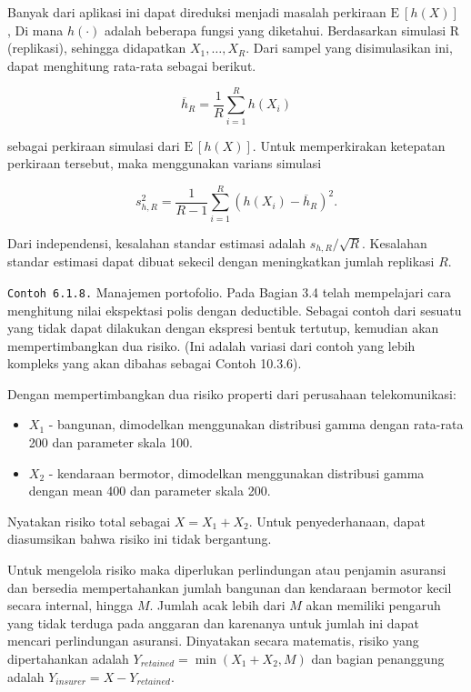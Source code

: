 \documentclass[
]{book}
\begin{document}
Banyak dari aplikasi ini dapat direduksi menjadi masalah perkiraan \(\mathrm{E~}[h(X)]\) , Di mana \(h(\cdot)\) adalah beberapa fungsi yang diketahui. Berdasarkan simulasi R (replikasi), sehingga didapatkan \(X_1,\ldots,X_R\). Dari sampel yang disimulasikan ini, dapat menghitung rata-rata sebagai berikut.

\[\overline{h}_R=\frac{1}{R}\sum_{i=1}^{R} h(X_i)\]

sebagai perkiraan simulasi dari \(\mathrm{E~}[h(X)]\). Untuk memperkirakan ketepatan perkiraan tersebut, maka menggunakan varians simulasi

\[s_{h,R}^2 = \frac{1}{R-1} \sum_{i=1}^{R}\left( h(X_i) -\overline{h}_R
\right) ^2.\]

Dari independensi, kesalahan standar estimasi adalah \(s_{h,R}/\sqrt{R}\). Kesalahan standar estimasi dapat dibuat sekecil dengan meningkatkan jumlah replikasi \(R\).

\texttt{Contoh\ 6.1.8.} Manajemen portofolio. Pada Bagian 3.4 telah mempelajari cara menghitung nilai ekspektasi polis dengan deductible. Sebagai contoh dari sesuatu yang tidak dapat dilakukan dengan ekspresi bentuk tertutup, kemudian akan mempertimbangkan dua risiko. (Ini adalah variasi dari contoh yang lebih kompleks yang akan dibahas sebagai Contoh 10.3.6).

Dengan mempertimbangkan dua risiko properti dari perusahaan telekomunikasi:

\begin{itemize}
\item
  \(X_1\) - bangunan, dimodelkan menggunakan distribusi gamma dengan rata-rata 200 dan parameter skala 100.
\item
  \(X_2\) - kendaraan bermotor, dimodelkan menggunakan distribusi gamma dengan mean 400 dan parameter skala 200.
\end{itemize}

Nyatakan risiko total sebagai \(X = X_1 + X_2\). Untuk penyederhanaan, dapat diasumsikan bahwa risiko ini tidak bergantung.

Untuk mengelola risiko maka diperlukan perlindungan atau penjamin asuransi dan bersedia mempertahankan jumlah bangunan dan kendaraan bermotor kecil secara internal, hingga \(M\). Jumlah acak lebih dari \(M\) akan memiliki pengaruh yang tidak terduga pada anggaran dan karenanya untuk jumlah ini dapat mencari perlindungan asuransi. Dinyatakan secara matematis, risiko yang dipertahankan adalah \(Y_{retained}=\min(X_1 + X_2,M)\) dan bagian penanggung adalah \(Y_{insurer} = X- Y_{retained}\).
\end{document}
